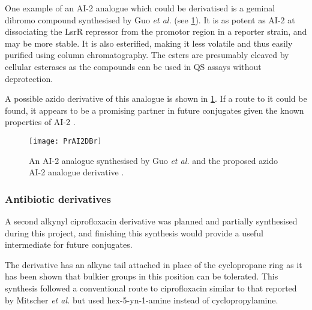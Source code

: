 One example of an AI-2 analogue which could be derivatised is a geminal dibromo compound  synthesised by Guo \textit{et al.}\cite{Guo2015} (see \ref{fgr:PrAI2DBr}). It is as potent as AI-2 at dissociating the LsrR repressor from the promotor region in a reporter strain, and may be more stable. It is also esterified, making it less volatile and thus easily purified using column chromatography. The esters are presumably cleaved by cellular esterases as the compounds can be used in QS assays without deprotection\cite{Guo2012}.

A possible azido derivative  of this analogue is shown in \ref{fgr:PrAI2DBr}. If a route to it could be found, it appears to be a promising partner in future conjugates given the known properties of AI-2 .

\begin{figure}[H]
	\begin{center}
		\texttt{[image: PrAI2DBr]}
		\caption{An AI-2 analogue  synthesised by Guo \textit{et al.} and the proposed azido AI-2 analogue derivative .
		\label{fgr:PrAI2DBr}} 
	\end{center}
\end{figure}





\subsubsection{Antibiotic derivatives}


A second alkynyl ciprofloxacin derivative  was planned and partially synthesised during this project, and finishing this synthesis would provide a useful intermediate for future conjugates.

The derivative  has an alkyne tail attached in place of the cyclopropane ring as it has been shown that bulkier groups in this position can be tolerated\cite{Mitscher1986,Chu1985}. This synthesis followed a conventional route to ciprofloxacin similar to that reported by Mitscher \textit{et al.}\cite{Mitscher1986} but used hex-5-yn-1-amine  instead of cyclopropylamine.

